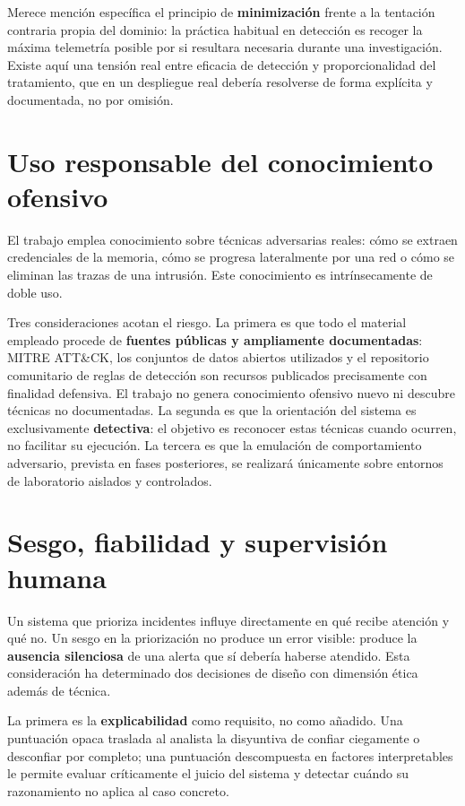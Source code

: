 Merece mención específica el principio de \textbf{minimización} frente a la tentación
contraria propia del dominio: la práctica habitual en detección es recoger la máxima
telemetría posible por si resultara necesaria durante una investigación. Existe aquí una
tensión real entre eficacia de detección y proporcionalidad del tratamiento, que en un
despliegue real debería resolverse de forma explícita y documentada, no por omisión.

\section{Uso responsable del conocimiento ofensivo}

El trabajo emplea conocimiento sobre técnicas adversarias reales: cómo se extraen
credenciales de la memoria, cómo se progresa lateralmente por una red o cómo se eliminan las
trazas de una intrusión. Este conocimiento es intrínsecamente de doble uso.

Tres consideraciones acotan el riesgo. La primera es que todo el material empleado procede de
\textbf{fuentes públicas y ampliamente documentadas}: MITRE ATT\&CK, los conjuntos de datos
abiertos utilizados y el repositorio comunitario de reglas de detección son recursos
publicados precisamente con finalidad defensiva. El trabajo no genera conocimiento ofensivo
nuevo ni descubre técnicas no documentadas. La segunda es que la orientación del sistema es
exclusivamente \textbf{detectiva}: el objetivo es reconocer estas técnicas cuando ocurren, no
facilitar su ejecución. La tercera es que la emulación de comportamiento adversario, prevista
en fases posteriores, se realizará únicamente sobre entornos de laboratorio aislados y
controlados.

\section{Sesgo, fiabilidad y supervisión humana}

Un sistema que prioriza incidentes influye directamente en qué recibe atención y qué no. Un
sesgo en la priorización no produce un error visible: produce la \textbf{ausencia silenciosa}
de una alerta que sí debería haberse atendido. Esta consideración ha determinado dos
decisiones de diseño con dimensión ética además de técnica.

La primera es la \textbf{explicabilidad} como requisito, no como añadido. Una puntuación
opaca traslada al analista la disyuntiva de confiar ciegamente o desconfiar por completo;
una puntuación descompuesta en factores interpretables le permite evaluar críticamente el
juicio del sistema y detectar cuándo su razonamiento no aplica al caso concreto.

